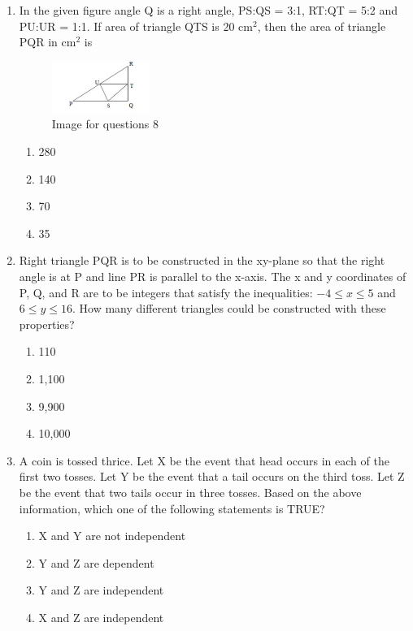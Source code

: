 \documentclass[journal,12pt,onecolumn]{IEEEtran}
\theoremstyle{remark}
\begin{document}
\begin{enumerate}
\item In the given figure angle Q is a right angle, PS:QS = 3:1, RT:QT = 5:2 and PU:UR = 1:1.  
If area of triangle QTS is 20 cm\(^2\), then the area of triangle PQR in cm\(^2\) is  

\begin{figure}[H]
    \centering
    \includegraphics[width=0.3\textwidth]{figs/fig1.png}
    \caption{Image for questions 8}
    \label{fig:question8}
\end{figure}

\begin{multicols}{4}
\begin{enumerate}
\item 280  
\item 140  
\item 70  
\item 35  
\end{enumerate}
\end{multicols}

\item Right triangle PQR is to be constructed in the xy-plane so that the right angle is at P and line PR is parallel to the x-axis.  
The x and y coordinates of P, Q, and R are to be integers that satisfy the inequalities: \(-4 \leq x \leq 5\) and \(6 \leq y \leq 16\).  
How many different triangles could be constructed with these properties?  
\begin{multicols}{2}
\begin{enumerate}
\item 110  
\item 1,100  
\item 9,900  
\item 10,000  
\end{enumerate}
\end{multicols}

\item A coin is tossed thrice. Let X be the event that head occurs in each of the first two tosses.  
Let Y be the event that a tail occurs on the third toss.  
Let Z be the event that two tails occur in three tosses.  
Based on the above information, which one of the following statements is TRUE?  
\begin{multicols}{2}
\begin{enumerate}
\item X and Y are not independent  
\item Y and Z are dependent  
\item Y and Z are independent  
\item X and Z are independent  
\end{enumerate}
\end{multicols}

\end{enumerate}
\end{document}
